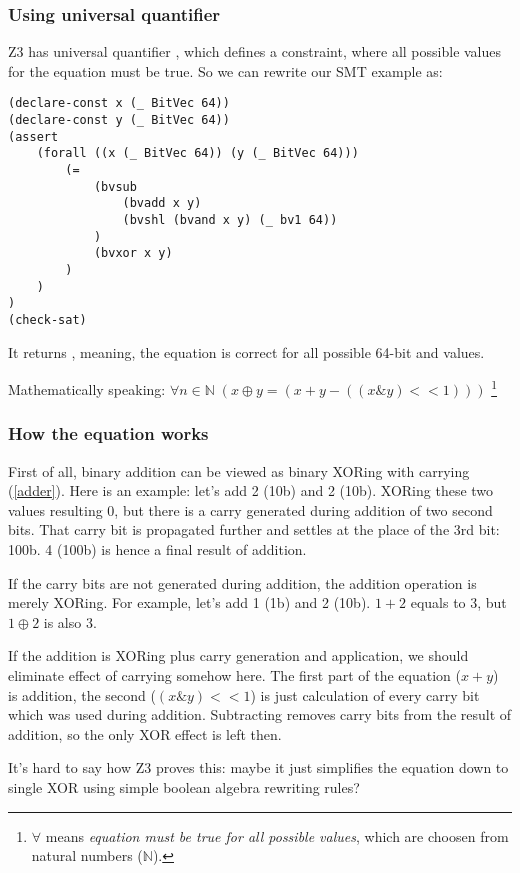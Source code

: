 \subsubsection{Using universal quantifier}

Z3 has universal quantifier , which defines a constraint, where all possible values for the equation must be true.
So we can rewrite our SMT example as:

\begin{lstlisting}
(declare-const x (_ BitVec 64))
(declare-const y (_ BitVec 64))
(assert 
	(forall ((x (_ BitVec 64)) (y (_ BitVec 64)))
		(=
			(bvsub 
				(bvadd x y)
				(bvshl (bvand x y) (_ bv1 64))
			)
			(bvxor x y)
		)
	)
)
(check-sat)
\end{lstlisting}

It returns , meaning, the equation is correct for all possible 64-bit  and  values.

Mathematically speaking: $\forall n\!\in\!\mathbb{N}\; (x \oplus y = (x + y - ((x \& y)<<1)))$
\footnote{
$\forall$ means \textit{equation must be true for all possible values}, which are choosen from natural numbers ($\mathbb{N}$).}

\subsubsection{How the equation works}

First of all, binary addition can be viewed as binary XORing with carrying (\ref{adder}).
Here is an example: let's add 2 (10b) and 2 (10b).
XORing these two values resulting 0, but there is a carry generated during addition of two second bits.
That carry bit is propagated further and settles at the place of the 3rd bit: 100b.
4 (100b) is hence a final result of addition.

If the carry bits are not generated during addition, the addition operation is merely XORing.
For example, let's add 1 (1b) and 2 (10b). $1 + 2$ equals to 3, but $1 \oplus 2$ is also 3.

If the addition is XORing plus carry generation and application, we should eliminate effect of carrying somehow here.
The first part of the equation ($x + y$) is addition, the second ($(x \& y)<<1$) is just calculation of every carry bit which was used during addition.
Subtracting removes carry bits from the result of addition, so the only XOR effect is left then.

It's hard to say how Z3 proves this: maybe it just simplifies the equation down to single XOR using simple boolean algebra rewriting rules?

